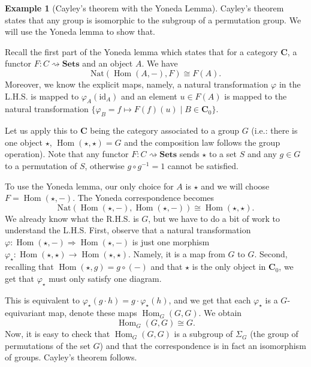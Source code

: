 \documentclass{article}
\theoremstyle{definition}
\newtheorem{exmp}[thm]{Example}
\theoremstyle{remark}
\DeclareMathOperator{\Hom}{Hom}
\newcommand{\id}{\text{id}}
\begin{document}
\begin{exmp}[Cayley's theorem with the Yoneda Lemma]
	Cayley's theorem states that any group is isomorphic to the subgroup of a permutation group. We will use the Yoneda lemma to show that.
	
	Recall the first part of the Yoneda lemma which states that for a category $\mathbf{C}$, a functor $F:C \rightsquigarrow \textbf{Sets}$ and an object $A$. We have $$\text{Nat}(\Hom(A, -), F) \cong F(A).$$Moreover, we know the explicit maps, namely, a natural transformation $\varphi$ in the L.H.S. is mapped to $\varphi_A(\id_A)$ and an element $u \in F(A)$ is mapped to the natural transformation $\{\varphi_B = f \mapsto F(f)(u) \mid B \in \mathbf{C}_0\}$.
	
	Let us apply this to $\mathbf{C}$ being the category associated to a group $G$ (i.e.: there is one object $\star$, $\Hom(\star, \star) = G$ and the composition law follows the group operation). Note that any functor $F: C\rightsquigarrow \textbf{Sets}$ sends $\star$ to a set $S$ and any $g \in G$ to a permutation of $S$, otherwise $g\circ g^{-1} = 1$ cannot be satisfied.
	
	To use the Yoneda lemma, our only choice for $A$ is $\star$ and we will choose $F = \Hom(\star, -)$. The Yoneda correspondence becomes
	$$ \text{Nat}(\Hom(\star, -), \Hom(\star,-)) \cong \Hom(\star, \star).$$
	We already know what the R.H.S. is $G$, but we have to do a bit of work to understand the L.H.S. First, observe that a natural transformation $\varphi: \Hom(\star, -) \Rightarrow \Hom(\star, -)$ is just one morphism $\varphi_{\star}: \Hom(\star, \star) \rightarrow \Hom(\star, \star)$. Namely, it is a map from $G$ to $G$. Second, recalling that $\Hom(\star, g) = g \circ (-)$ and that $\star$ is the only object in $\mathbf{C}_0$, we get that $\varphi_{\star}$ must only satisfy one diagram.
	\begin{figure}[H]
		\centering
	\end{figure}
	This is equivalent to $\varphi_{\star}(g \cdot h) = g \cdot \varphi_{\star}(h)$, and we get that each $\varphi_{\star}$ is a $G$-equivariant map, denote these maps $\Hom_G(G,G)$. We obtain
	$$\Hom_G(G,G) \cong G.$$
	Now, it is easy to check that $\Hom_G(G,G)$ is a subgroup of $\Sigma_G$ (the group of permutations of the set $G$) and that the correspondence is in fact an isomorphism of groups. Cayley's theorem follows.
	

\end{exmp}
\end{document}
